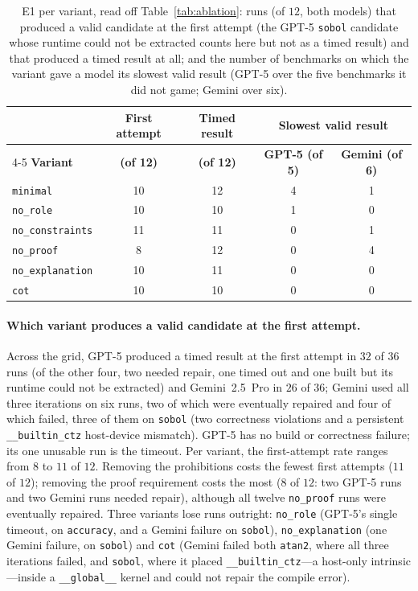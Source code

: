 \begin{table}[t]
\centering
\footnotesize
\caption{E1 per variant, read off Table~\ref{tab:ablation}: runs (of $12$, both models) that
  produced a valid candidate at the first attempt (the GPT-5 \texttt{sobol} candidate whose runtime
  could not be extracted counts here but not as a timed result) and that produced a timed result at
  all; and the
  number of benchmarks on which the variant gave a model its slowest valid result (GPT-5 over the
  five benchmarks it did not game; Gemini over six).}
\label{tab:variantsum}
\setlength{\tabcolsep}{5pt}
\begin{tabular}{@{}lcccc@{}}
\toprule
 & \textbf{First attempt} & \textbf{Timed result} & \multicolumn{2}{c}{\textbf{Slowest valid result}} \\
\cmidrule(lr){4-5}
\textbf{Variant} & \textbf{(of 12)} & \textbf{(of 12)} & \textbf{GPT-5 (of 5)} & \textbf{Gemini (of 6)} \\
\midrule
\texttt{minimal}         & 10 & 12 & 4 & 1 \\
\texttt{no\_role}        & 10 & 10 & 1 & 0 \\
\texttt{no\_constraints} & 11 & 11 & 0 & 1 \\
\texttt{no\_proof}       &  8 & 12 & 0 & 4 \\
\texttt{no\_explanation} & 10 & 11 & 0 & 0 \\
\texttt{cot}             & 10 & 10 & 0 & 0 \\
\bottomrule
\end{tabular}
\end{table}

\paragraph{Which variant produces a valid candidate at the first attempt.}
Across the grid, GPT-5 produced a timed result at the first attempt in $32$ of $36$ runs (of the other
four, two needed repair, one timed out and one built but its runtime could not be extracted) and
Gemini~2.5~Pro in $26$ of $36$; Gemini used all three iterations on six runs, two of which were
eventually repaired and four of which failed, three of them on \texttt{sobol} (two correctness
violations and a persistent \texttt{\_\_builtin\_ctz} host-device mismatch). GPT-5 has no build or
correctness failure; its one unusable run is the timeout. Per variant, the first-attempt rate ranges
from $8$ to $11$ of $12$. Removing the prohibitions costs the fewest first attempts ($11$ of $12$);
removing the proof requirement costs the most ($8$ of $12$: two GPT-5 runs and two Gemini runs needed
repair), although all twelve \texttt{no\_proof} runs were eventually repaired. Three variants
lose runs outright: \texttt{no\_role} (GPT-5's single timeout, on \texttt{accuracy}, and a Gemini
failure on \texttt{sobol}), \texttt{no\_explanation} (one Gemini failure, on \texttt{sobol}) and
\texttt{cot} (Gemini failed both \texttt{atan2}, where all three iterations failed, and
\texttt{sobol}, where it placed \texttt{\_\_builtin\_ctz}---a host-only intrinsic---inside a
\texttt{\_\_global\_\_} kernel and could not repair the compile error).

